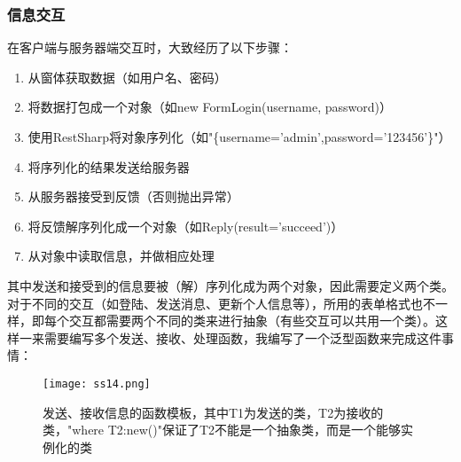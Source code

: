 \documentclass[a4paper,11pt]{article}
\begin{document}
        \subsubsection{信息交互}
            在客户端与服务器端交互时，大致经历了以下步骤：\par
            \begin{enumerate}
                \item 从窗体获取数据（如用户名、密码）
                \item 将数据打包成一个对象（如new FormLogin(username, password)）
                \item 使用RestSharp\textsuperscript{\cite{6}}将对象序列化（如"\{username='admin',password='123456'\}"）
                \item 将序列化的结果发送给服务器
                \item 从服务器接受到反馈（否则抛出异常）
                \item 将反馈解序列化成一个对象（如Reply(result='succeed')）
                \item 从对象中读取信息，并做相应处理
            \end{enumerate}
            其中发送和接受到的信息要被（解）序列化成为两个对象，因此需要定义两个类。对于不同的交互（如登陆、发送消息、更新个人信息等），所用的表单格式也不一样，即每个交互都需要两个不同的类来进行抽象（有些交互可以共用一个类）。这样一来需要编写多个发送、接收、处理函数，我编写了一个泛型函数来完成这件事情：
            \begin{figure}[H]
                \centering
                \texttt{[image: ss14.png]}
                \caption{发送、接收信息的函数模板，其中T1为发送的类，T2为接收的类，"where T2:new()"保证了T2不能是一个抽象类，而是一个能够实例化的类}
            \end{figure}
\end{document}
